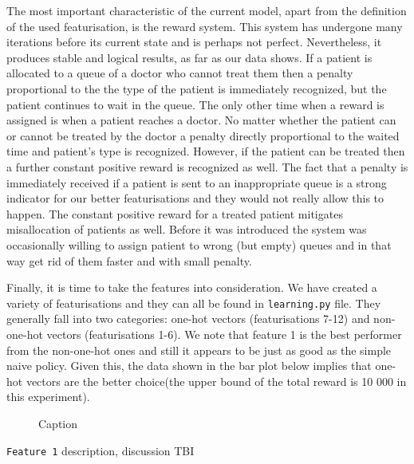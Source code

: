 \documentclass[11point]{article}
\begin{document}
The most important characteristic of the current model, apart from the definition of the used featurisation, is the reward system. This system has undergone many iterations before its current state and is perhaps not perfect. Nevertheless, it produces stable and logical results, as far as our data shows. If a patient is allocated to a queue of a doctor who cannot treat them then a penalty proportional to the the type of the patient is immediately recognized, but the patient continues to wait in the queue. The only other time when a reward is assigned is when a patient reaches a doctor. No matter whether the patient can or cannot be treated by the doctor a penalty directly proportional to the waited time and patient's type is recognized. However, if the patient can be treated then a further constant positive reward is recognized as well. The fact that a penalty is immediately  received if a patient is sent to an inappropriate queue is a strong indicator for our better featurisations and they would not really allow this to happen. The constant positive reward for a treated patient mitigates misallocation of patients as well. Before it was introduced the system was occasionally willing to assign patient to wrong (but empty)
queues and in that way get rid of them faster and with small penalty.

Finally, it is time to take the features into consideration. We have created a variety of featurisations and they can all be found in \texttt{learning.py} file. They generally fall into two categories: one-hot vectors (featurisations 7-12) and non-one-hot vectors (featurisations 1-6). We note that feature 1 is the best performer from the non-one-hot ones and still it appears to be just as good as the simple naive policy. Given this, the data shown in the bar plot below implies that one-hot vectors are the better choice(the upper bound of the total reward is 10 000 in this experiment).



\pgfplotsset{width=8cm,compat=1.8}
\begin{figure}
    \centering

\begin{adjustwidth*}{-0.2cm}{}
    
    \caption{Caption}
    \label{fig:my_label}

\end{adjustwidth*}
\end{figure}

\texttt{Feature 1} description, discussion TBI
\end{document}

